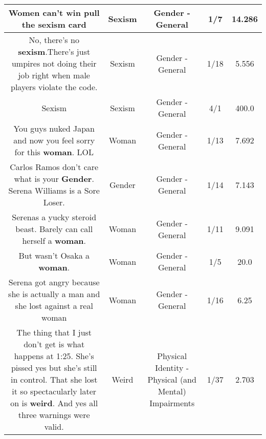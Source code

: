 \documentclass[11pt]{article}
\newlength\mylength
\begin{document}
\begin{center}
\begin{longtable}{|C{.65\mylength}|C{.30\mylength}|C{.12\mylength}|C{.12\mylength}|C{.12\mylength}|}
  \small Women can't win pull the \textbf{sexism} card\normalsize   & Sexism & Gender - General & 1/7 & 14.286 \\  \hline
  \small No, there's no \textbf{sexism}.There's just umpires not doing their job right when male players violate the code.\normalsize   & Sexism & Gender - General & 1/18 & 5.556 \\  \hline
  \small Sexism\normalsize   & Sexism & Gender - General & 4/1 & 400.0 \\  \hline
  \small You guys nuked Japan and now you feel sorry for this \textbf{woman}. LOL\normalsize   & Woman & Gender - General & 1/13 & 7.692 \\  \hline
  \small Carlos Ramos don't care what is your \textbf{Gender}. Serena Williams is a Sore Loser.\normalsize   & Gender & Gender - General & 1/14 & 7.143 \\  \hline
  \small Serenas a yucky steroid beast. Barely can call herself a \textbf{woman}.\normalsize   & Woman & Gender - General & 1/11 & 9.091 \\  \hline
  \small But wasn't Osaka a \textbf{woman}.\normalsize   & Woman & Gender - General & 1/5 & 20.0 \\  \hline
  \small Serena got angry because she is actually a man and she lost against a real woman\normalsize   & Woman & Gender - General & 1/16 & 6.25 \\  \hline
  \small The thing that I just don't get is what happens at 1:25. She's pissed yes but she's still in control. That she lost it so spectacularly later on is \textbf{weird}. And yes all three warnings were valid.\normalsize   & Weird & Physical Identity - Physical (and Mental) Impairments & 1/37 & 2.703 \\  \hline

\end{longtable}
\end{center}
\end{document}
